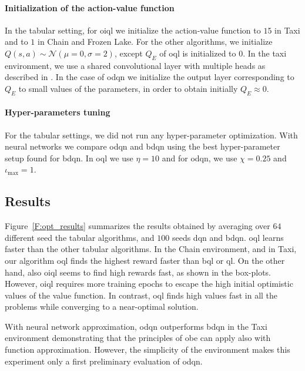 \paragraph{Initialization of the action-value function} In the tabular setting, for \gls{oiql} we initialize the action-value function to $15$ in Taxi and to $1$ in Chain and Frozen Lake. For the other algorithms, we initialize $Q(s,a) \sim \mathcal{N}(\mu=0,\sigma=2)$, except $Q_E$ of \gls{oql} is initialized to $0$.
In the taxi environment, we use a shared convolutional layer with multiple heads as described in \cite{osband2017deep}. In the case of \gls{odqn} we initialize the output layer corresponding to $Q_E$ to small values of the parameters, in order to obtain initially $Q_E \approx 0$. 

\paragraph{Hyper-parameters tuning} For the tabular settings, we did not run any hyper-parameter optimization. With neural networks we compare \gls{odqn} and \gls{bdqn} using the best hyper-parameter setup found for \gls{bdqn}. In \gls{oql} we use $\eta=10$ and for \gls{odqn}, we use $\chi=0.25$ and $\iota_{\max}=1$.

\setlength\figureheight{4cm}
\setlength\figurewidth{4cm}
% 	
\subsection{Results}
Figure~\ref{F:opt_results} summarizes the results obtained by averaging over $64$ different seed the tabular algorithms, and $100$ seeds \gls{dqn} and \gls{bdqn}. \gls{oql} learns faster than the other tabular algorithms. In the Chain environment, and in Taxi,
our algorithm \gls{oql} finds the highest reward faster than \gls{bql} or \gls{ql}. On the other hand, also \gls{oiql} seems to find
high rewards fast, as shown in the box-plots. However, \gls{oiql} requires more training epochs to escape the high initial
optimistic values of the value function. In contrast, \gls{oql} finds high values fast in all the problems while converging to a near-optimal solution.

With neural network approximation, \gls{odqn} outperforms \gls{bdqn} in the Taxi environment demonstrating that the principles of \gls{obe} can apply also with function approximation. However, the simplicity of the environment makes this experiment only a first preliminary evaluation of \gls{odqn}.
